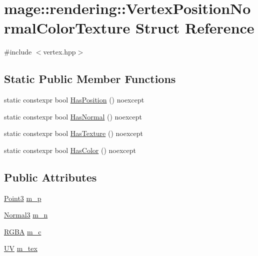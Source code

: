 \hypertarget{structmage_1_1rendering_1_1_vertex_position_normal_color_texture}{}\section{mage\+:\+:rendering\+:\+:Vertex\+Position\+Normal\+Color\+Texture Struct Reference}
\label{structmage_1_1rendering_1_1_vertex_position_normal_color_texture}


{\ttfamily \#include $<$vertex.\+hpp$>$}

\subsection*{Static Public Member Functions}
\begin{DoxyCompactItemize}
\item 
static constexpr bool \mbox{\hyperlink{structmage_1_1rendering_1_1_vertex_position_normal_color_texture_a137dda2aa8e30d88c87b53cd4d2d2842}{Has\+Position}} () noexcept
\item 
static constexpr bool \mbox{\hyperlink{structmage_1_1rendering_1_1_vertex_position_normal_color_texture_aa8f1585c1dba229b765d5697a37cb0e6}{Has\+Normal}} () noexcept
\item 
static constexpr bool \mbox{\hyperlink{structmage_1_1rendering_1_1_vertex_position_normal_color_texture_a8b5e0a50a6119868ebf90247d321f172}{Has\+Texture}} () noexcept
\item 
static constexpr bool \mbox{\hyperlink{structmage_1_1rendering_1_1_vertex_position_normal_color_texture_a1688dd4509c6766bea6fc15a4bcb348d}{Has\+Color}} () noexcept
\end{DoxyCompactItemize}
\subsection*{Public Attributes}
\begin{DoxyCompactItemize}
\item 
\mbox{\hyperlink{structmage_1_1_point3}{Point3}} \mbox{\hyperlink{structmage_1_1rendering_1_1_vertex_position_normal_color_texture_a7eb2e2d7970bd3794d9b6f9f3b1db3e7}{m\+\_\+p}}
\item 
\mbox{\hyperlink{structmage_1_1_normal3}{Normal3}} \mbox{\hyperlink{structmage_1_1rendering_1_1_vertex_position_normal_color_texture_aa42ee4c320dec19edeef4a7018d68329}{m\+\_\+n}}
\item 
\mbox{\hyperlink{structmage_1_1_r_g_b_a}{R\+G\+BA}} \mbox{\hyperlink{structmage_1_1rendering_1_1_vertex_position_normal_color_texture_a0fe59b253cf0a9118fbc67ea5a18df81}{m\+\_\+c}}
\item 
\mbox{\hyperlink{structmage_1_1_u_v}{UV}} \mbox{\hyperlink{structmage_1_1rendering_1_1_vertex_position_normal_color_texture_a3c964b9b06e3bcc59b33fc1a273c13a7}{m\+\_\+tex}}
\end{DoxyCompactItemize}
